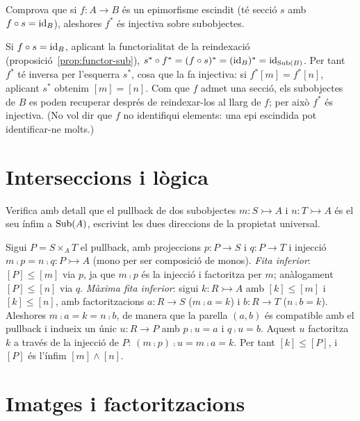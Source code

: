 \begin{exercici}
Comprova que si $f\colon A\to B$ és un epimorfisme escindit (té secció $s$ amb $f\circ s=\operatorname{id}_B$), aleshores $f^{*}$ és injectiva sobre subobjectes.
\end{exercici}

\begin{solucio}
Si $f\circ s=\operatorname{id}_B$, aplicant la functorialitat de la reindexació (proposició~\ref{prop:functor-sub}), $s^{*}\circ f^{*}=(f\circ s)^{*}=(\operatorname{id}_B)^{*}=\operatorname{id}_{\operatorname{Sub}(B)}$. Per tant $f^{*}$ té inversa per l'esquerra $s^{*}$, cosa que la fa injectiva: si $f^{*}[m]=f^{*}[n]$, aplicant $s^{*}$ obtenim $[m]=[n]$. Com que $f$ admet una secció, els subobjectes de $B$ es poden recuperar després de reindexar-los al llarg de $f$; per això $f^{*}$ és injectiva. (No vol dir que $f$ no identifiqui elements: una epi escindida pot identificar-ne molts.)
\end{solucio}

\section{Interseccions i lògica}

\begin{exercici}
Verifica amb detall que el pullback de dos subobjectes $m\colon S\rightarrowtail A$ i $n\colon T\rightarrowtail A$ és el seu ínfim a $\operatorname{Sub}(A)$, escrivint les dues direccions de la propietat universal.
\end{exercici}

\begin{solucio}
Sigui $P=S\times_A T$ el pullback, amb projeccions $p\colon P\to S$ i $q\colon P\to T$ i injecció $m\comp p=n\comp q\colon P\rightarrowtail A$ (mono per ser composició de monos). \emph{Fita inferior}: $[P]\leq[m]$ via $p$, ja que $m\comp p$ és la injecció i factoritza per $m$; anàlogament $[P]\leq[n]$ via $q$. \emph{Màxima fita inferior}: sigui $k\colon R\rightarrowtail A$ amb $[k]\leq[m]$ i $[k]\leq[n]$, amb factoritzacions $a\colon R\to S$ ($m\comp a=k$) i $b\colon R\to T$ ($n\comp b=k$). Aleshores $m\comp a=k=n\comp b$, de manera que la parella $(a,b)$ és compatible amb el pullback i indueix un únic $u\colon R\to P$ amb $p\comp u=a$ i $q\comp u=b$. Aquest $u$ factoritza $k$ a través de la injecció de $P$: $(m\comp p)\comp u=m\comp a=k$. Per tant $[k]\leq[P]$, i $[P]$ és l'ínfim $[m]\wedge[n]$.
\end{solucio}

\section{Imatges i factoritzacions}

